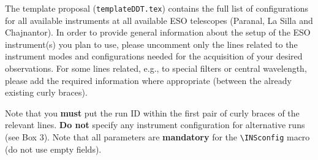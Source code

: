 \documentclass{article}
\begin{document}
The template proposal ({\tt templateDDT.tex}) contains 
the full list of configurations for all available instruments at all
available ESO telescopes (Paranal, La Silla and Chajnantor).  In order
to provide 
general information about the setup of the ESO instrument(s) you plan
to use, please uncomment only the lines related to the instrument
modes and configurations needed for the acquisition of your desired
observations.  For some lines related, e.g., to special filters or
central wavelength, please add the required information where
appropriate (between the already existing curly
braces).

Note that you {\bf must} put the run ID within the first pair of curly
braces of the relevant lines. {\bf Do not} specify any instrument
configuration for alternative runs (see Box 3). 
Note that all parameters are {\bf mandatory} for the \verb|\INSconfig|
macro (do not use empty fields).


%
%
%
\end{document}
